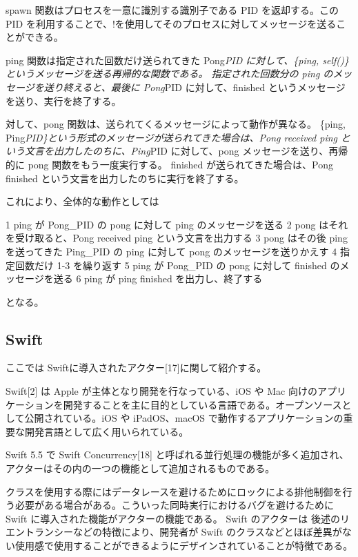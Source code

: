 spawn 関数はプロセスを一意に識別する識別子である PID を返却する。この
PID
を利用することで、!を使用してそのプロセスに対してメッセージを送ることができる。

ping 関数は指定された回数だけ送られてきた Pong\emph{PID
に対して、\{ping, self()\}というメッセージを送る再帰的な関数である。
指定された回数分の ping のメッセージを送り終えると、最後に Pong}PID
に対して、finished というメッセージを送り、実行を終了する。

対して、pong 関数は、送られてくるメッセージによって動作が異なる。
\{ping, Ping\emph{PID\}という形式のメッセージが送られてきた場合は、Pong
received ping という文言を出力したのちに、Ping}PID に対して、pong
メッセージを送り、再帰的に pong 関数をもう一度実行する。 finished
が送られてきた場合は、Pong finished
という文言を出力したのちに実行を終了する。

これにより、全体的な動作としては

1 ping が Pong\_PID の pong に対して ping のメッセージを送る 2 pong
はそれを受け取ると、Pong received ping という文言を出力する 3 pong
はその後 ping を送ってきた Ping\_PID の ping に対して pong
のメッセージを送りかえす 4 指定回数だけ 1-3 を繰り返す 5 ping が
Pong\_PID の pong に対して finished のメッセージを送る 6 ping が ping
finished を出力し、終了する

となる。

\subsection{Swift}

ここでは Swiftに導入されたアクター{[}17{]}に関して紹介する。

Swift{[}2{]} は Apple が主体となり開発を行なっている、iOS や Mac
向けのアプリケーションを開発することを主に目的としている言語である。オープンソースとして公開されている。iOS
や iPadOS、macOS
で動作するアプリケーションの重要な開発言語として広く用いられている。

Swift 5.5 で Swift Concurrency{[}18{]}
と呼ばれる並行処理の機能が多く追加され、アクターはその内の一つの機能として追加されるものである。

クラスを使用する際にはデータレースを避けるためにロックによる排他制御を行う必要がある場合がある。こういった同時実行におけるバグを避けるために
Swift に導入された機能がアクターの機能である。 Swift のアクターは
後述のリエントランシーなどの特徴により、開発者が Swift
のクラスなどとほぼ差異がない使用感で使用することができるようにデザインされていることが特徴である。


